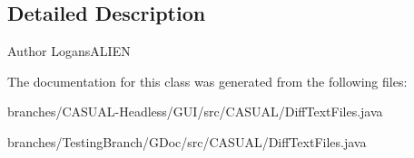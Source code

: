 \subsection{Detailed Description}
\begin{DoxyAuthor}{Author}
Logans\-A\-L\-I\-E\-N 
\end{DoxyAuthor}


The documentation for this class was generated from the following files\-:\begin{DoxyCompactItemize}
\item 
branches/\-C\-A\-S\-U\-A\-L-\/\-Headless/\-G\-U\-I/src/\-C\-A\-S\-U\-A\-L/Diff\-Text\-Files.\-java\item 
branches/\-Testing\-Branch/\-G\-Doc/src/\-C\-A\-S\-U\-A\-L/Diff\-Text\-Files.\-java\end{DoxyCompactItemize}

